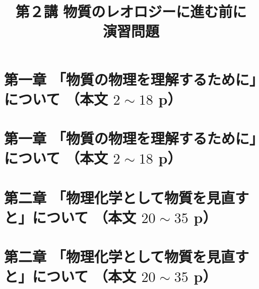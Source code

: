 \documentclass[uplatex,dvipdfmx,a4paper,11pt]{jsreport}
\title{第２講 物質のレオロジーに進む前に\\演習問題}
\author{}
\date{}
\begin{document}
\maketitle

\section*{第一章 「物質の物理を理解するために」について （本文 $2\sim18$ p）}

\clearpage
\section*{第一章 「物質の物理を理解するために」について （本文 $2\sim18$ p）}


\clearpage
\section*{第二章 「物理化学として物質を見直すと」について （本文 $20\sim35$ p）}

\clearpage
\section*{第二章 「物理化学として物質を見直すと」について （本文 $20\sim35$ p）}

\end{document}
